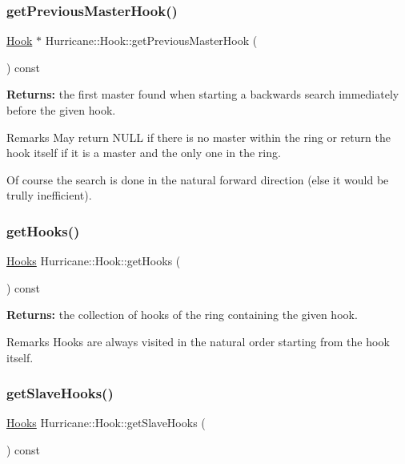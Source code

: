 \subsubsection{\texorpdfstring{get\+Previous\+Master\+Hook()}{getPreviousMasterHook()}}
{\footnotesize\ttfamily \mbox{\hyperlink{classHurricane_1_1Hook}{Hook}} $\ast$ Hurricane\+::\+Hook\+::get\+Previous\+Master\+Hook (\begin{DoxyParamCaption}{ }\end{DoxyParamCaption}) const}

{\bfseries Returns\+:} the first master found when starting a backwards search immediately before the given hook.

\begin{DoxyRemark}{Remarks}
May return N\+U\+LL if there is no master within the ring or return the hook itself if it is a master and the only one in the ring.

Of course the search is done in the natural forward direction (else it would be trully inefficient). 
\end{DoxyRemark}
\mbox{\label{classHurricane_1_1Hook_a2def96fbcd444bebc16e589357c2a779}} 
\subsubsection{\texorpdfstring{get\+Hooks()}{getHooks()}}
{\footnotesize\ttfamily \mbox{\hyperlink{namespaceHurricane_a9dcd9b74dc5e2b51bec7a13c25807e02}{Hooks}} Hurricane\+::\+Hook\+::get\+Hooks (\begin{DoxyParamCaption}{ }\end{DoxyParamCaption}) const}

{\bfseries Returns\+:} the collection of hooks of the ring containing the given hook.

\begin{DoxyRemark}{Remarks}
Hooks are always visited in the natural order starting from the hook itself. 
\end{DoxyRemark}
\mbox{\label{classHurricane_1_1Hook_ad3c977e4f253a18cf24dfe4a6fd24cb1}} 
\subsubsection{\texorpdfstring{get\+Slave\+Hooks()}{getSlaveHooks()}}
{\footnotesize\ttfamily \mbox{\hyperlink{namespaceHurricane_a9dcd9b74dc5e2b51bec7a13c25807e02}{Hooks}} Hurricane\+::\+Hook\+::get\+Slave\+Hooks (\begin{DoxyParamCaption}{ }\end{DoxyParamCaption}) const}

